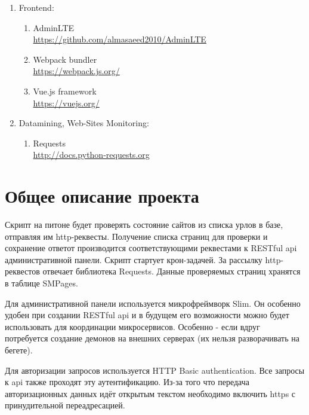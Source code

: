 \documentclass{scrreprt}
\begin{document}
\begin{enumerate}[]
	\item Frontend:
	\begin{enumerate}[-]
		\item AdminLTE \\
		\url{https://github.com/almasaeed2010/AdminLTE}
		\item Webpack bundler \\
		\url{https://webpack.js.org/}
		\item Vue.js framework \\
		\url{https://vuejs.org/}
	\end{enumerate}

	\item Datamining, Web-Sites Monitoring:
	\begin{enumerate}[-]
		\item Requests \\
		\url{http://docs.python-requests.org}
	\end{enumerate}
\end{enumerate}
\chapter{Общее описание проекта}
Скрипт на питоне будет проверять состояние сайтов из списка урлов в базе, отправляя им http-реквесты. 
Получение списка страниц для проверки и сохранение ответот производится соответствующими реквестами к RESTful api административной панели.
Скрипт стартует крон-задачей. За рассылку http-реквестов отвечает библиотека Requests. 
Данные проверяемых страниц хранятся в таблице SMPages.

Для административной панели используется микрофреймворк Slim. Он особенно удобен при создании RESTful api и в будущем его возможности можно будет использовать для координации микросервисов. 
Особенно - если вдруг потребуется создание демонов на внешних серверах (их нельзя разворачивать на бегете).

Для авторизации запросов используется HTTP Basic authentication. Все запросы к api также проходят эту аутентификацию. 
Из-за того что передача авторизационных данных идёт открытым текстом необходимо включить https с принудительной переадресацией.
\end{document}
